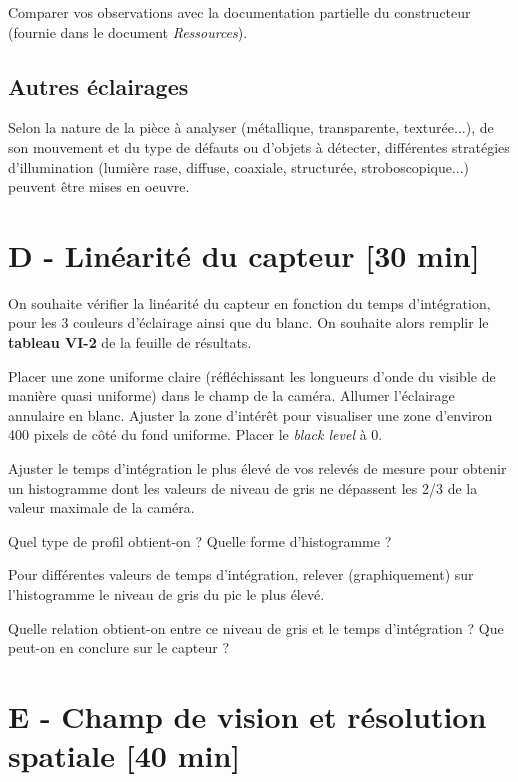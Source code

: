 \medskip

\Quest Comparer vos observations avec la documentation partielle du constructeur (fournie dans le document \textit{Ressources}).

\vfill

\subsection{Autres éclairages}

Selon la nature de la pièce à analyser (métallique, transparente, texturée...), de son mouvement et du type de défauts ou d'objets à détecter, différentes stratégies d'illumination (lumière rase, diffuse, coaxiale, structurée, stroboscopique...) peuvent être mises en oeuvre. 



\newpage
\section{D - Linéarité du capteur {[30 min]}}

On souhaite vérifier la linéarité du capteur en fonction du temps d'intégration, pour les 3 couleurs d'éclairage ainsi que du blanc. On souhaite alors remplir le \textbf{tableau VI-2} de la feuille de résultats.

\Manip Placer une zone uniforme claire (réfléchissant les longueurs d'onde du visible de manière quasi uniforme) dans le champ de la caméra. Allumer l'éclairage annulaire en blanc. Ajuster la zone d'intérêt pour visualiser une zone d'environ 400 pixels de côté du fond uniforme. Placer le \textit{black level} à 0.

\Manip Ajuster le temps d'intégration le plus élevé de vos relevés de mesure pour obtenir un histogramme dont les valeurs de niveau de gris ne dépassent les  2/3 de la valeur maximale de la caméra. 

\Quest Quel type de profil obtient-on ? Quelle forme d'histogramme ?

\Manip Pour différentes valeurs de temps d'intégration, relever (graphiquement) sur l'histogramme le niveau de gris du pic le plus élevé.

\Quest Quelle relation obtient-on entre ce niveau de gris et le temps d'intégration ? Que peut-on en conclure sur le capteur ?



\section{E - Champ de vision et résolution spatiale {[40 min]}}


